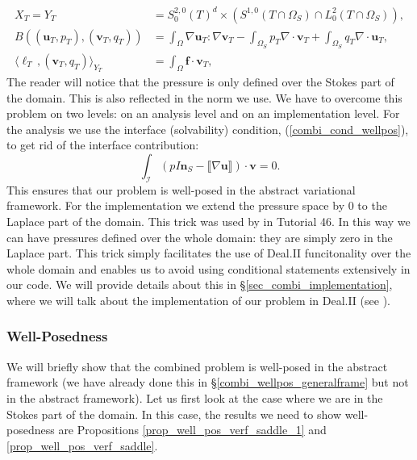 \documentclass[12pt,a4paper]{article}
\theoremstyle{definition}
\begin{document}
\begin{equation}\label{frame_combi_disc}
\begin{aligned}
X_T=Y_T&=S_0^{2,0}\left(T\right)^d\times \left(S^{1,0}\left(T\cap\Omega_S\right)\cap L^2_0\left(T\cap\Omega_S\right)\right),\\
B\left(\left(\textbf{u}_T,p_T\right),\left(\textbf{v}_T,q_T\right)\right)&=\int_{\Omega}\nabla \textbf{u}_T : \nabla \textbf{v}_T - \int_{\Omega_S} p_T \nabla\cdot\textbf{v}_T + \int_{\Omega_S} q_T \nabla\cdot\textbf{u}_T,\\
\langle \ell_T\,,\left(\textbf{v}_T,q_T\right) \rangle_{Y_T} &= \int_{\Omega}\textbf{f}\cdot \textbf{v}_T,
\end{aligned}
\end{equation}
 The reader will notice that the pressure is only defined over the Stokes part of the domain. This is also reflected in the norm we use.  
 We have to overcome this problem on two levels:  on an analysis level  and on an implementation level.  For  the analysis we use the interface (solvability) condition, (\ref{combi_cond_wellpos}), to get rid of the interface contribution:
 \begin{equation}\label{interface_condition}
\int_{\mathcal{I}} \left(pI \textbf{n}_S-\llbracket\nabla\textbf{u}\rrbracket\right)\cdot\textbf{v}= 0.
 \end{equation}
 This ensures that our problem is well-posed in the abstract variational framework.  For the implementation  we extend the pressure space by $0$ to the Laplace part of the domain.  This trick was used by \cite{BangerthHartmannKanschat2007} in Tutorial 46.   In this way we can have pressures defined over the whole  domain: they are simply zero in the Laplace part.  This trick simply facilitates the use of Deal.II funcitonality over the whole domain and enables us to avoid  using conditional statements extensively in our code.  We will provide details about this in \S \ref{sec_combi_implementation}, where we will talk about the implementation of our problem in Deal.II (see \cite{BangerthHartmannKanschat2007}).
 \subsubsection{Well-Posedness}
 We will briefly show that the combined problem is well-posed in the abstract framework (we have already done this in \S \ref{combi_wellpos_generalframe} but not in the abstract framework).  Let us first look at the case where we are in the Stokes part of the domain.  In this case, the results we need to show well-posedness are Propositions \ref{prop_well_pos_verf_saddle_1} and \ref{prop_well_pos_verf_saddle}.  
 
\end{document}
